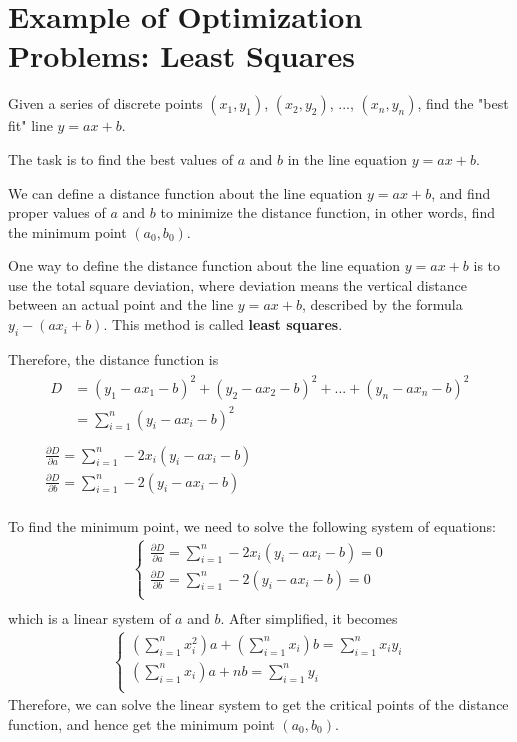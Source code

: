 \documentclass{article}
\begin{document}
\section{Example of Optimization Problems: Least Squares}

Given a series of discrete points $(x_1, y_1)$, $(x_2, y_2)$, ..., $(x_n, y_n)$, 
find the "best fit" line $y = ax + b$.

The task is to find the best values of $a$ and $b$ in the line equation 
$y = ax + b$.

We can define a distance function about the line equation $y = ax + b$, and find 
proper values of $a$ and $b$ to minimize the distance function, in other words, 
find the minimum point $(a_0, b_0)$.

\bigskip

One way to define the distance function about the line equation $y = ax + b$ is 
to use the total square deviation, where deviation means the vertical distance 
between an actual point and the line $y = ax + b$, described by the formula 
$y_i - (ax_i + b)$. This method is called \textbf{least squares}.

Therefore, the distance function is 
\begin{gather*}
  \begin{split}
    D &= (y_1 - ax_1 - b)^2 + (y_2 - ax_2 - b)^2 + ... + (y_n - ax_n - b)^2 \\
      &= \sum_{i=1}^{n}(y_i - ax_i - b)^2 \\
  \end{split} \\
  \frac{\partial D}{\partial a} = \sum_{i=1}^{n}-2x_i(y_i - ax_i - b) \\
  \frac{\partial D}{\partial b} = \sum_{i=1}^{n}-2(y_i - ax_i - b) \\
\end{gather*}

To find the minimum point, we need to solve the following system of equations:
\begin{gather*}
  \begin{cases}
    \frac{\partial D}{\partial a} = \sum_{i=1}^{n}-2x_i(y_i - ax_i - b) = 0 \\
    \frac{\partial D}{\partial b} = \sum_{i=1}^{n}-2(y_i - ax_i - b) = 0 \\
  \end{cases} \\
\end{gather*}
which is a linear system of $a$ and $b$. After simplified, it becomes
\begin{gather*}
  \begin{cases}
    (\sum_{i=1}^{n}x_i^2)a + (\sum_{i=1}^{n}x_i)b = \sum_{i=1}^{n}x_iy_i \\
    (\sum_{i=1}^{n}x_i)a + nb = \sum_{i=1}^{n}y_i \\
  \end{cases}
\end{gather*}
Therefore, we can solve the linear system to get the critical points of the 
distance function, and hence get the minimum point $(a_0, b_0)$.
\end{document}
